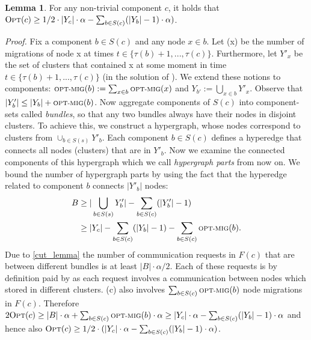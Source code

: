 \documentclass[xcolor=dvipsnames, tikz, 12pt]{article}
\newcommand{\nl}{\newline}
\newcommand{\optmig}{\text{\scriptsize OPT-MIG}}
\newcommand{\opt}{\text{O{\scriptsize PT}}}
\theoremstyle{definition}
\newtheorem{lemma}[defi]{Lemma}
\begin{document}
	\begin{lemma}
		\label{lem11}
		For any non-trivial component $c$, it holds that $\opt(c)\geq1/2\cdot|Y_c|\cdot\alpha-\sum_{b\in S(c)}(|Y_b|-1)\cdot\alpha)$.
	\end{lemma}

	\textit{Proof.} Fix a component $b\in S(c)$ and any node $x\in b$. Let \optmig(x) be the number of \opt migrations of node x at times $t\in\{\tau(b)+1,...,\tau(c)\}$. Furthermore, let $Y'_x$ be the set of clusters that contained x at some moment in time $t\in\{\tau(b)+1,...,\tau(c)\}$ (in the solution of \opt). We extend these notions to components: $\optmig{}(b):=\sum_{x\in b}\optmig(x)$ and $Y_{b'}:=\bigcup_{x\in b}Y'_x$. Observe that $|Y_b'|\leq|Y_b|+\optmig(b)$.\nl
	Now aggregate components of $S(c)$ into component-sets called \textit{bundles}, so that any two bundles always have their nodes in disjoint clusters. To achieve this, we construct a hypergraph, whose nodes correspond to clusters from $\cup_{b\in S(s)}Y'_b$. Each component $b\in S(c)$ defines a hyperedge that connects all nodes (clusters) that are in $Y'_b$. Now we examine the connected components of this hypergraph which we call  \textit{hypergraph parts} from now on.
	We bound the number of hypergraph parts by using the fact that the hyperedge related to component $b$ connects $|Y'_b|$ nodes:
	\begin{align*}
		B&\geq|\bigcup_{b\in S(s)}Y'_b|-\sum_{b\in S(c)}(|Y'_b|-1)\\
		&\geq|Y_c|-\sum_{b\in S(c)}(|Y_b|-1)-\sum_{b\in S(c)}\optmig(b).
	\end{align*}
	Due to \cref{cut_lemma} the number of communication requests in $F(c)$ that are between different bundles is at least $|B|\cdot\alpha/2$. Each of these requests is by definition paid by \opt as each request involves a communication between nodes which \opt stored in different clusters.
	\opt(c) also involves $\sum_{b\in S(c)}\optmig(b)$ node migrations in $F(c)$.\nl
	Therefore $2\opt{}(c)\geq|B|\cdot\alpha+\sum_{b\in S(c)}\optmig(b)\cdot\alpha\geq|Y_c|\cdot\alpha-\sum_{b\in S(c)}(|Y_b|-1)\cdot\alpha$ and hence also
	$\opt(c)\geq1/2\cdot(|Y_c|\cdot\alpha-\sum_{b\in S(c)}(|Y_b|-1)\cdot\alpha)$.\nl
\end{document}
